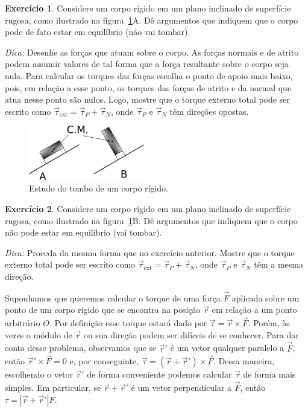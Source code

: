 \documentclass[papersize=a4,DIV=calc,twocolumn=on]{scrartcl}
\theoremstyle{definition}
\newtheorem{ex}{Exercício}[section]
\begin{document}
\begin{ex}
  Considere um corpo rígido em um plano inclinado de superfície
  rugosa, como ilustrado na figura~\ref{fig:tombo}A. Dê argumentos que
  indiquem que o corpo pode de fato estar em equilíbrio (não vai
  tombar).

  \noindent\textit{Dica:} Desenhe as forças que atuam sobre o
  corpo. As forças normais e de atrito podem assumir valores de tal
  forma que a força resultante sobre o corpo seja nula. Para calcular
  os torques das forças escolha o ponto de apoio mais baixo, pois, em
  relação a esse ponto, os torques das forças de atrito e da normal
  que atua nesse ponto são nulos. Logo, mostre que o torque externo
  total pode ser escrito como
  $\vec \tau_{\mathrm{ext}}=\vec\tau_P+\vec\tau_N$, onde $\vec\tau_P$
  e $\vec\tau_N$ têm direções opostas.
  \begin{figure}[ht]
    \centering
    \includegraphics[width=0.45\textwidth,keepaspectratio]{tombo.pdf}
    \caption{Estudo do tombo de um corpo rígido.}
    \label{fig:tombo}
  \end{figure}
\end{ex}

\begin{ex}
  Considere um corpo rígido em um plano inclinado de superfície
  rugosa, como ilustrado na figura~\ref{fig:tombo}B. Dê argumentos que
  indiquem que o corpo não pode estar em equilíbrio (vai tombar).

  \noindent\textit{Dica:} Proceda da mesma forma que no exercício
  anterior. Mostre que o torque externo total pode ser escrito como
  $\vec\tau_{\mathrm{ext}}=\vec\tau_P+\vec\tau_N$, onde $\vec\tau_P$ e
  $\vec\tau_N$ têm a mesma direção.
\end{ex}

Suponhamos que queremos calcular o torque de uma força $\vec F$
aplicada sobre um ponto de um corpo rígido que se encontra na posição
$\vec r$ em relação a um ponto arbitrário $O$. Por definição esse
torque estará dado por $\vec\tau=\vec r\times\vec F$. Porém, às vezes
o módulo de $\vec r$ ou sua direção podem ser difíceis de se
conhecer. Para dar conta desse problema, observamos que se $\vec r'$ é
um vetor qualquer paralelo a $\vec F$, então $\vec r'\times\vec F=0$
e, por conseguinte, $\vec\tau=(\vec r+\vec r')\times \vec F$. Dessa
maneira, escolhendo o vetor $\vec r'$ de forma conveniente podemos
calcular $\vec\tau$ de forma mais simples. Em particular, se
$\vec r+\vec r'$ é um vetor perpendicular a $\vec F$, então
$\tau=|\vec r+\vec r'|F$.
\end{document}

